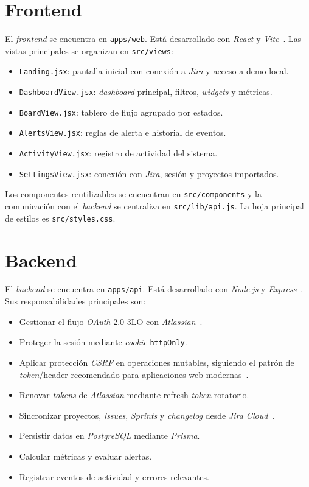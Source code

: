 \begin{refsection}
\section{Frontend}

El \textit{frontend} se encuentra en \texttt{apps/web}. Está desarrollado con \textit{React} y \textit{Vite}~\cite{ReactDocs,ViteDocs}. Las vistas principales se organizan en \texttt{src/views}:

\begin{itemize}
    \item \texttt{Landing.jsx}: pantalla inicial con conexión a \textit{Jira} y acceso a demo local.
    \item \texttt{DashboardView.jsx}: \textit{dashboard} principal, filtros, \textit{widgets} y métricas.
    \item \texttt{BoardView.jsx}: tablero de flujo agrupado por estados.
    \item \texttt{AlertsView.jsx}: reglas de alerta e historial de eventos.
    \item \texttt{ActivityView.jsx}: registro de actividad del sistema.
    \item \texttt{SettingsView.jsx}: conexión con \textit{Jira}, sesión y proyectos importados.
\end{itemize}

Los componentes reutilizables se encuentran en \texttt{src/components} y la comunicación con el \textit{backend} se centraliza en \texttt{src/lib/api.js}. La hoja principal de estilos es \texttt{src/styles.css}.

\section{Backend}

El \textit{backend} se encuentra en \texttt{apps/api}. Está desarrollado con \textit{Node.js} y \textit{Express}~\cite{NodeDocs,ExpressDocs}. Sus responsabilidades principales son:

\begin{itemize}
    \item Gestionar el flujo \textit{OAuth} 2.0 3LO con \textit{Atlassian}~\cite{AtlassianOAuth3LO,OWASPOAuth2}.
    \item Proteger la sesión mediante \textit{cookie} \texttt{httpOnly}.
    \item Aplicar protección \textit{CSRF} en operaciones mutables, siguiendo el patrón de \textit{token}/header recomendado para aplicaciones web modernas~\cite{OWASPCSRF}.
    \item Renovar \textit{tokens} de \textit{Atlassian} mediante refresh \textit{token} rotatorio.
    \item Sincronizar proyectos, \textit{issues}, \textit{Sprints} y \textit{changelog} desde \textit{Jira Cloud}~\cite{AtlassianJiraRestV3,AtlassianJiraIssuesApi}.
    \item Persistir datos en \textit{PostgreSQL} mediante \textit{Prisma}.
    \item Calcular métricas y evaluar alertas.
    \item Registrar eventos de actividad y errores relevantes.
\end{itemize}


\end{refsection}
